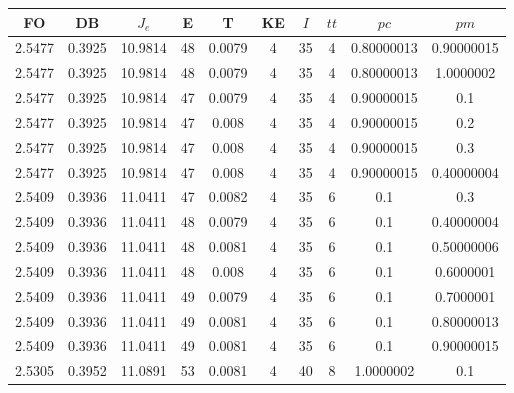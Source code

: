 \begin{table}[h!]
    \footnotesize
    \begin{center}
        \begin{tabular}{|c|c|c|c|c|c|c|c|c|c|}
        \hline
            {\bf FO} & {\bf DB} & $J_e$ & {\bf E} & {\bf T} & {\bf KE} & $I$ & $tt$ & $pc$ & $pm$ \\
        \hline
        \hline
            2.5477 & 0.3925  & 10.9814 & 48 & 0.0079 & 4 & 35 & 4 & 0.80000013 & 0.90000015\\
        \hline
        \hline
            2.5477 & 0.3925  & 10.9814 & 48 & 0.0079 & 4 & 35 & 4 & 0.80000013 & 1.0000002\\
        \hline
        \hline
            2.5477 & 0.3925  & 10.9814 & 47 & 0.0079 & 4 & 35 & 4 & 0.90000015 & 0.1\\
        \hline
        \hline
            2.5477 & 0.3925  & 10.9814 & 47 & 0.008 & 4 & 35 & 4 & 0.90000015 & 0.2\\
        \hline
        \hline
            2.5477 & 0.3925  & 10.9814 & 47 & 0.008 & 4 & 35 & 4 & 0.90000015 & 0.3\\
        \hline
        \hline
            2.5477 & 0.3925  & 10.9814 & 47 & 0.008 & 4 & 35 & 4 & 0.90000015 & 0.40000004\\
        \hline
        \hline
            2.5409 & 0.3936  & 11.0411 & 47 & 0.0082 & 4 & 35 & 6 & 0.1 & 0.3\\
        \hline
        \hline
            2.5409 & 0.3936  & 11.0411 & 48 & 0.0079 & 4 & 35 & 6 & 0.1 & 0.40000004\\
        \hline
        \hline
            2.5409 & 0.3936  & 11.0411 & 48 & 0.0081 & 4 & 35 & 6 & 0.1 & 0.50000006\\
        \hline
        \hline
            2.5409 & 0.3936  & 11.0411 & 48 & 0.008 & 4 & 35 & 6 & 0.1 & 0.6000001\\
        \hline
        \hline
            2.5409 & 0.3936  & 11.0411 & 49 & 0.0079 & 4 & 35 & 6 & 0.1 & 0.7000001\\
        \hline
        \hline
            2.5409 & 0.3936  & 11.0411 & 49 & 0.0081 & 4 & 35 & 6 & 0.1 & 0.80000013\\
        \hline
        \hline
            2.5409 & 0.3936  & 11.0411 & 49 & 0.0081 & 4 & 35 & 6 & 0.1 & 0.90000015\\
        \hline
        \hline
            2.5305 & 0.3952  & 11.0891 & 53 & 0.0081 & 4 & 40 & 8 & 1.0000002 & 0.1\\
        \hline
        \hline

\end{tabular}
\end{center}
\end{table}
